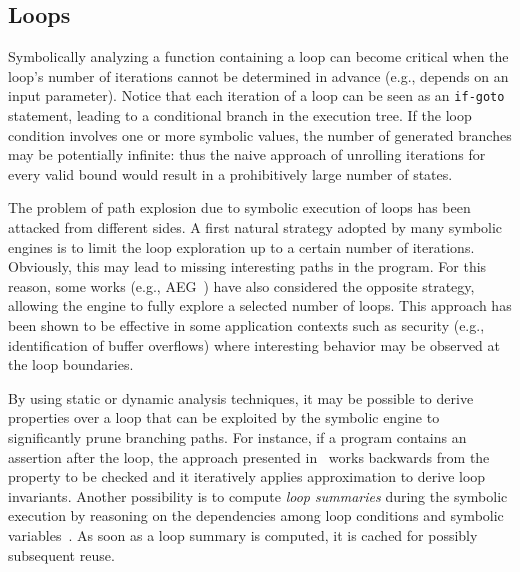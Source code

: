 
\subsection{Loops}
\label{ss:loops}

Symbolically analyzing a function containing a loop can become critical when the loop's number of iterations cannot be determined in advance (e.g., depends on an input parameter). Notice that each iteration of a loop can be seen as an {\tt if-goto} statement, leading to a conditional branch in the execution tree. If the loop condition involves one or more symbolic values, the number of generated branches may be potentially infinite: thus the naive approach of unrolling iterations for every valid bound would result in a prohibitively large number of states.


The problem of path explosion due to symbolic execution of loops has been attacked from different sides. A first natural strategy adopted by many symbolic engines is to limit the loop exploration up to a certain number of iterations. Obviously, this may lead to missing interesting paths in the program. For this reason, some works (e.g., {\sc AEG}~\cite{AEG-NDSS11}) have also considered the opposite strategy, allowing the engine to fully explore a selected number of loops. This approach has been shown to be effective in some application contexts such as security (e.g., identification of buffer overflows) where interesting behavior may be observed at the loop boundaries.

By using static or dynamic analysis techniques, it may be possible to derive properties over a loop that can be exploited by the symbolic engine to significantly prune branching paths. 
For instance, if a program contains an assertion after the loop, the approach presented in~\cite{PV-SPIN04} works backwards from the property to be checked and it iteratively applies approximation to derive loop invariants.
Another possibility is to compute {\em loop summaries} during the symbolic execution by reasoning on the dependencies among loop conditions and symbolic variables~\cite{GL-ISSTA11}. As soon as a loop summary is computed, it is cached for possibly subsequent reuse. %

